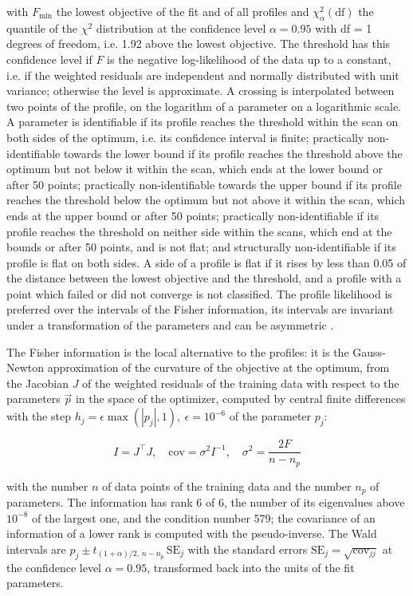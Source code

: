 with $F_{\min}$ the lowest objective of the fit and of all profiles and $\chi^2_{\alpha}(\mathrm{df})$ the quantile of the $\chi^2$ distribution at the confidence level $\alpha = 0.95$ with df = 1 degrees of freedom, i.e. 1.92 above the lowest objective. The threshold has this confidence level if $F$ is the negative log-likelihood of the data up to a constant, i.e. if the weighted residuals are independent and normally distributed with unit variance; otherwise the level is approximate. A crossing is interpolated between two points of the profile, on the logarithm of a parameter on a logarithmic scale. A parameter is identifiable if its profile reaches the threshold within the scan on both sides of the optimum, i.e. its confidence interval is finite; practically non-identifiable towards the lower bound if its profile reaches the threshold above the optimum but not below it within the scan, which ends at the lower bound or after 50 points; practically non-identifiable towards the upper bound if its profile reaches the threshold below the optimum but not above it within the scan, which ends at the upper bound or after 50 points; practically non-identifiable if its profile reaches the threshold on neither side within the scans, which end at the bounds or after 50 points, and is not flat; and structurally non-identifiable if its profile is flat on both sides. A side of a profile is flat if it rises by less than 0.05 of the distance between the lowest objective and the threshold, and a profile with a point which failed or did not converge is not classified. The profile likelihood is preferred over the intervals of the Fisher information, its intervals are invariant under a transformation of the parameters and can be asymmetric \cite{Wieland2021}.

The Fisher information is the local alternative to the profiles: it is the Gauss-Newton approximation of the curvature of the objective at the optimum, from the Jacobian $J$ of the weighted residuals of the training data with respect to the parameters $\vec{p}$ in the space of the optimizer, computed by central finite differences with the step $h_j = \epsilon \max(|p_j|, 1),\ \epsilon = 10^{-6}$ of the parameter $p_j$:

\begin{equation}
I = J^\top J, \quad \mathrm{cov} = \sigma^2 I^{-1}, \quad \sigma^2 = \frac{2 F}{n - n_p}
\end{equation}

with the number $n$ of data points of the training data and the number $n_p$ of parameters. The information has rank 6 of 6, the number of its eigenvalues above $10^{-8}$ of the largest one, and the condition number 579; the covariance of an information of a lower rank is computed with the pseudo-inverse. The Wald intervals are $\hat{p}_j \pm t_{(1+\alpha)/2,\, n-n_p}\, \mathrm{SE}_j$ with the standard errors $\mathrm{SE}_j = \sqrt{\mathrm{cov}_{jj}}$ at the confidence level $\alpha = 0.95$, transformed back into the units of the fit parameters.

